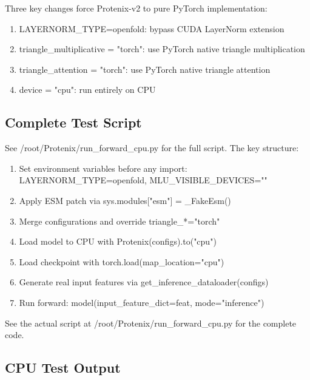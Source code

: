 \documentclass[12pt,a4paper]{article}
\begin{document}
Three key changes force Protenix-v2 to pure PyTorch implementation:

\begin{enumerate}
    \item LAYERNORM_TYPE=openfold: bypass CUDA LayerNorm extension
    \item triangle_multiplicative = "torch": use PyTorch native triangle multiplication
    \item triangle_attention = "torch": use PyTorch native triangle attention
    \item device = "cpu": run entirely on CPU
\end{enumerate}

\subsection{Complete Test Script}

See /root/Protenix/run_forward_cpu.py for the full script. The key structure:

\begin{enumerate}
    \item Set environment variables before any import: LAYERNORM_TYPE=openfold, MLU_VISIBLE_DEVICES=""
    \item Apply ESM patch via sys.modules["esm"] = _FakeEsm()
    \item Merge configurations and override triangle_*="torch"
    \item Load model to CPU with Protenix(configs).to("cpu")
    \item Load checkpoint with torch.load(map_location="cpu")
    \item Generate real input features via get_inference_dataloader(configs)
    \item Run forward: model(input_feature_dict=feat, mode="inference")
\end{enumerate}

See the actual script at /root/Protenix/run_forward_cpu.py for the complete code.

\clearpage

\subsection{CPU Test Output}
\end{document}
